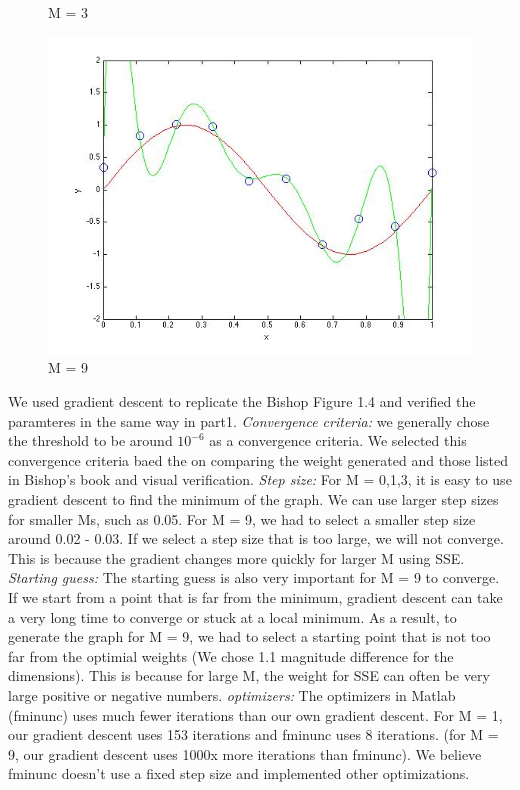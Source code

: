 \begin{figure}[!htb]
  \caption{M = 3}\label{fig:figures/p2_M=3}
\endminipage\hfill
{}                                                                            
  \includegraphics[width=\linewidth]{figures/p2_M=9}
  \caption{M = 9}\label{fig:figures/p2_M=9}
\endminipage\hfill
\end{figure}


We used gradient descent to replicate 
the Bishop Figure 1.4 and verified the paramteres in the same way in part1. 
\textit{Convergence criteria:} we generally chose the threshold to be around $10^{-6}$ as a convergence criteria. We selected this convergence criteria baed the on comparing the weight generated and those listed in Bishop's book and visual verification. 
\textit{Step size:} For M = 0,1,3, it is easy to use gradient descent to find the minimum of the graph. We can use larger step sizes for smaller Ms, such as 0.05. For M = 9, we had to select a smaller step size around 0.02 - 0.03. If we select a step size that is too large, we will not converge. This is because the gradient changes more quickly for larger M using SSE.
\textit{Starting guess:} The starting guess is also very important for M = 9 to converge. If we start from a point that is far from the minimum, gradient descent can take a very long time to converge or stuck at a local minimum. As a result, to generate the graph for M = 9, we had to select a starting point that is not too far from the optimial weights (We chose 1.1 magnitude difference for the dimensions). This is because for large M, the weight for SSE can often be very large positive or negative numbers. 
\textit{optimizers:} The optimizers in Matlab (fminunc) uses much fewer iterations than our own gradient descent. For M = 1, our gradient descent uses 153 iterations and fminunc uses 8 iterations. (for M = 9, our gradient descent uses 1000x more iterations than fminunc). We believe fminunc doesn't use a fixed step size and implemented other optimizations. 
